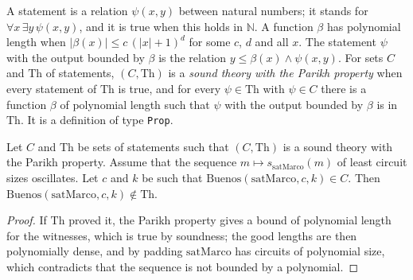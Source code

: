 \begin{definition}
  \label{def:arithmetic-hyp-parikh-sound}
  \leanok
  \own{}
  A statement is a relation $\psi(x, y)$ between natural numbers; it stands for $\forall x\, \exists y\,
  \psi(x, y)$, and it is true when this holds in $\mathbb{N}$. A function $\beta$ has polynomial length
  when $|\beta(x)| \le c\,(|x| + 1)^d$ for some $c$, $d$ and all $x$. The statement $\psi$ with the
  output bounded by $\beta$ is the relation $y \le \beta(x) \wedge \psi(x, y)$. For sets $C$ and
  $\mathrm{Th}$ of statements, $(C, \mathrm{Th})$ is a \emph{sound theory with the Parikh property}
  when every statement of $\mathrm{Th}$ is true, and for every $\psi \in \mathrm{Th}$ with $\psi \in
  C$ there is a function $\beta$ of polynomial length such that $\psi$ with the output bounded by
  $\beta$ is in $\mathrm{Th}$. It is a definition of type \texttt{Prop}.
\end{definition}

\begin{theorem}
  \label{thm:arithmetic-oscillation-unprovable}
  \leanok
  Let $C$ and $\mathrm{Th}$ be sets of statements such that $(C, \mathrm{Th})$ is a sound theory
  with the Parikh property. Assume that the sequence $m \mapsto s_{\mathrm{satMarco}}(m)$ of least
  circuit sizes oscillates. Let $c$ and $k$ be such that $\mathrm{Buenos}(\mathrm{satMarco}, c,
  k) \in C$. Then $\mathrm{Buenos}(\mathrm{satMarco}, c, k) \notin \mathrm{Th}$.
\end{theorem}

\begin{proof}
  \leanok
  If $\mathrm{Th}$ proved it, the Parikh property gives a bound of polynomial length for the witnesses,
  which is true by soundness; the good lengths are then polynomially dense, and by padding
  $\mathrm{satMarco}$ has circuits of polynomial size, which contradicts that the sequence is not
  bounded by a polynomial.
\end{proof}

